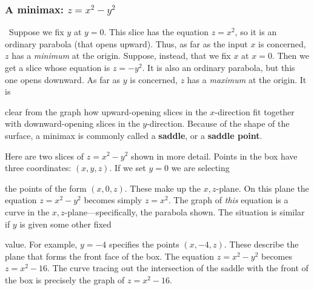{{{{\subsubsection{A minimax: $z = x^2 - y^2$}


\label{saddle}
\quad \ Suppose we fix $y$ at $y = 0$.  This slice has the equation $z = x^2$, so it is an ordinary parabola (that opens upward).  Thus, as far as the input $x$ is concerned, $z$ has a {\em minimum\/} at the origin.  Suppose, instead, that we fix $x$ at $x = 0$. Then we get a slice whose equation is $z = -y^2$.  It is also an ordinary parabola, but this one opens downward.  As far as $y$ is concerned, $z$ has a {\em maximum\/} at the origin.  It is 
\linebreak
\vspace{-9pt}

\noindent
clear from the  graph how upward-opening slices in the $x$-direction fit together with downward-opening slices in the $y$-direction.  Because of the shape of the surface, a minimax is commonly called a {\bf saddle}, or a {\bf saddle point}.

\newpage

	Here are two slices of $z = x^2 - y^2$ shown in more detail.  Points in the box have three coordinates: $(x, y, z)$.  If we set $y = 0$ we are selecting 
\linebreak



\vspace{200pt}

\noindent
the points of the form $(x, 0, z)$.  These make up the $x, z$-plane.  On this plane the equation $z = x^2 - y^2$ becomes simply $z = x^2$.  The graph of {\em this\/} equation is a curve in the $x, z$-plane---specifically, the parabola shown.  The situation is similar if $y$ is given some other fixed  
\linebreak
\vspace{-9pt}

\noindent
value. For example, $y = -4$ specifies the points $(x, -4, z)$.   
These describe the plane that forms the front face of the box.  The equation $z = x^2 - y^2$ becomes $z = x^2 - 16$.  The curve tracing out the intersection of the saddle with the front of the box is precisely the graph of $z = x^2 - 16$.  

}}}}
